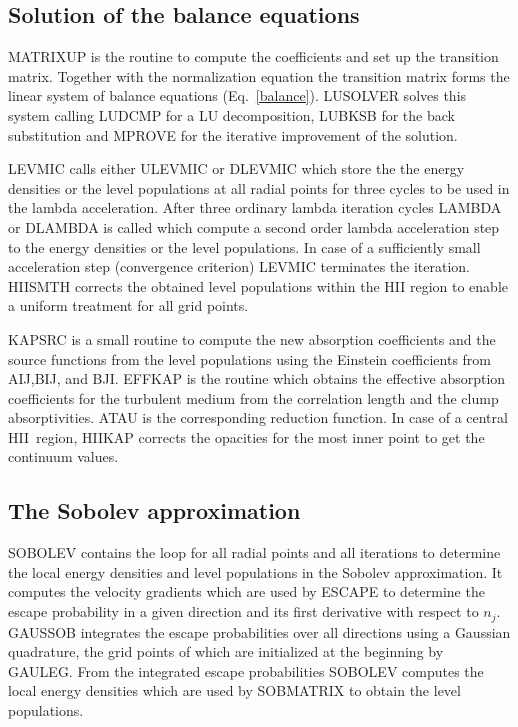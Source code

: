 \subsection{Solution of the balance equations}

MATRIXUP is the routine to compute the coefficients and set up
the transition matrix. Together with the normalization equation 
the transition matrix forms the linear system of 
balance equations (Eq.\ \ref{balance}).
LUSOLVER solves this system calling LUDCMP for a LU decomposition,
LUBKSB for the back substitution and MPROVE for the iterative 
improvement of the solution.

LEVMIC calls either ULEVMIC or DLEVMIC which store the
the energy densities or the level populations at all radial points 
for three cycles to be used in the lambda acceleration. After three 
ordinary lambda iteration cycles LAMBDA or DLAMBDA is called which 
compute a second order lambda acceleration step to the energy 
densities  or the level populations.
In case of a sufficiently small acceleration step 
(convergence criterion) LEVMIC terminates the iteration. HIISMTH
corrects the obtained level populations within the HII region
to enable a uniform treatment for all grid points.

KAPSRC is a small routine to compute the new absorption coefficients
and the source functions from the level populations using the
Einstein coefficients from AIJ,BIJ, and BJI. EFFKAP is the routine
which obtains the effective absorption coefficients for the turbulent
medium from the correlation length and the clump absorptivities.
ATAU is the corresponding reduction function. In case of a central
HII~region, HIIKAP corrects the opacities for the most inner point
to get the continuum values.

\subsection{The Sobolev approximation}

SOBOLEV contains the loop for all radial points and all iterations
to determine the local energy densities and level populations in
the Sobolev approximation. It computes the velocity gradients
which are used by ESCAPE to determine the escape probability 
in a given direction and its first derivative with respect to $n_j$. 
GAUSSOB integrates the escape probabilities over all directions
using a Gaussian quadrature, the grid points of which are 
initialized at the beginning by GAULEG. From the integrated
escape probabilities SOBOLEV computes the local energy densities
which are used by SOBMATRIX to obtain the level populations.

